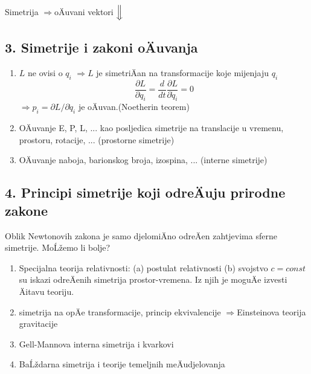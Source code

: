 \documentclass[a4paper,twoside]{article}
\newcommand{\Ra}{$\Rightarrow$}
\begin{document}
Simetrija \Ra oÄuvani vektori $\Big\Downarrow$


\subsection*{3. Simetrije i zakoni oÄuvanja}

\begin{enumerate}[-]

\item $L$ ne ovisi o $q_i$ \Ra $L$ je simetriÄan
na transformacije koje mijenjaju $q_i$ 
\[
    \frac{\partial L}{\partial q_i}=\frac{d}{dt}\frac{\partial L}
{\partial \dot{q}_i}=0
\]
\Ra $p_i=\partial L/\partial\dot{q}_i$ je oÄuvan.(Noetherin teorem)

\item OÄuvanje E, P, L, ... kao posljedica simetrije na translacije
 u vremenu, prostoru, rotacije, ... (prostorne simetrije)

\item OÄuvanje naboja, barionskog broja, izospina, ... (interne simetrije)
\end{enumerate}

\subsection*{4. Principi simetrije koji odreÄuju prirodne zakone}

Oblik Newtonovih zakona je samo djelomiÄno odreÄen zahtjevima
sferne simetrije. MoĹžemo li bolje?

\begin{enumerate}[-]

\item Specijalna teorija relativnosti: 
  (a) postulat relativnosti (b) svojstvo $c=const$ su iskazi
  odreÄenih simetrija prostor-vremena. Iz njih je moguÄe izvesti
  Äitavu teoriju.

\item simetrija na opÄe transformacije, princip ekvivalencije
  \Ra Einsteinova teorija gravitacije

\item Gell-Mannova interna simetrija i kvarkovi

\item BaĹždarna simetrija i teorije temeljnih meÄudjelovanja
\end{enumerate}
\end{document}
